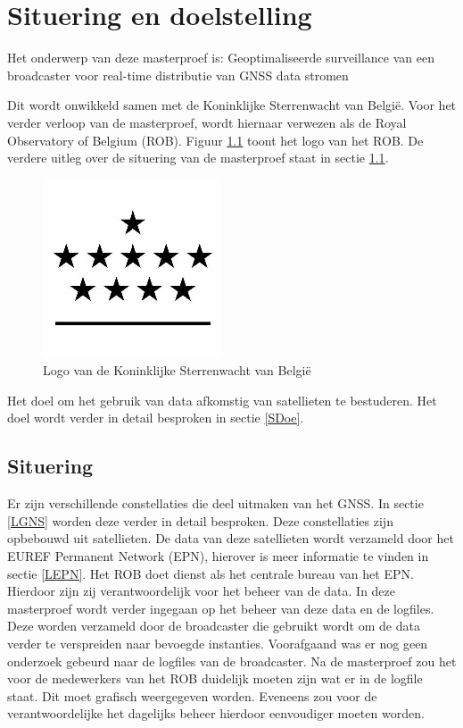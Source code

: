 \newcommand*{\MyIndentSit}{\hspace*{1 cm}}%

\chapter{Situering en doelstelling}
\label{Situering}
Het onderwerp van deze masterproef is: \newline
\MyIndentSit Geoptimaliseerde surveillance van een broadcaster voor real-time distributie van GNSS data stromen


Dit wordt onwikkeld samen met de Koninklijke Sterrenwacht van Belgi\"e. Voor het verder verloop van de masterproef, wordt hiernaar verwezen als de Royal Observatory of Belgium (ROB). Figuur \ref{imgROB} toont het logo van het ROB. De verdere uitleg over de situering van de masterproef staat in sectie \ref{SSit}.

\begin{figure}[hpb]
	\includegraphics[scale=1]{ROB.jpg}
	\caption{Logo van de Koninklijke Sterrenwacht van Belgi\"e \cite{SImgROB}}
	\label{imgROB}
\end{figure} 

Het doel om het gebruik van data afkomstig van satellieten te bestuderen. Het doel wordt verder in detail besproken in sectie \ref{SDoe}.

\section{Situering}
\label{SSit}
Er zijn verschillende constellaties die deel uitmaken van het GNSS. In sectie \ref{LGNS} worden deze verder in detail besproken. Deze constellaties zijn opbebouwd uit satellieten. De data van deze satellieten wordt verzameld door het EUREF Permanent Network (EPN), hierover is meer informatie te vinden in sectie \ref{LEPN}. Het ROB doet dienst als het centrale bureau van het EPN. Hierdoor zijn zij verantwoordelijk voor het beheer van de data. In deze masterproef wordt verder ingegaan op het beheer van deze data en de logfiles. Deze worden verzameld door de broadcaster die gebruikt wordt om de data verder te verspreiden naar bevoegde instanties. Voorafgaand was er nog geen onderzoek gebeurd naar de logfiles van de broadcaster. Na de masterproef zou het voor de medewerkers van het ROB duidelijk moeten zijn wat er in de logfile staat. Dit moet grafisch weergegeven worden. Eveneens zou voor de verantwoordelijke het dagelijks beheer hierdoor eenvoudiger moeten worden. 

